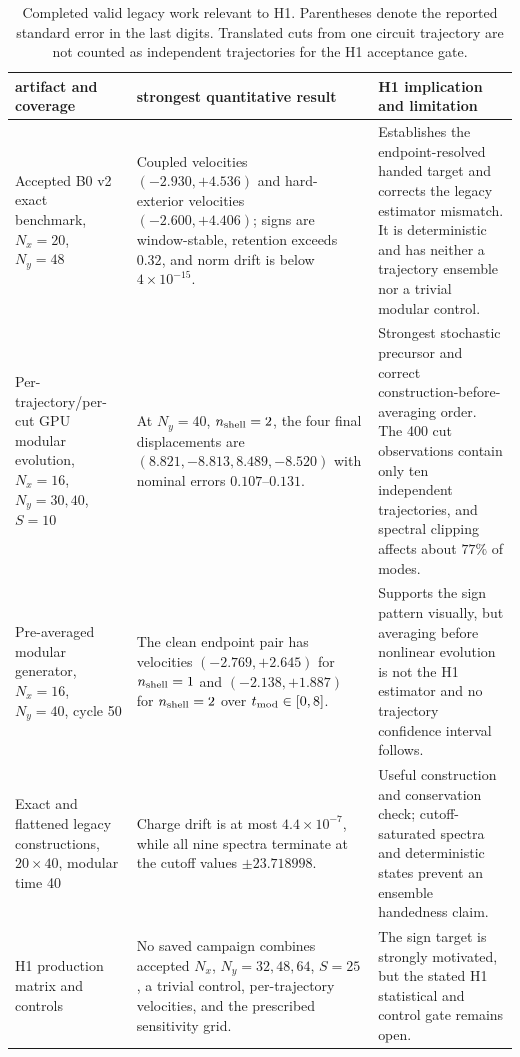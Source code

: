\documentclass[aps,prx,twocolumn,floatfix,nofootinbib,superscriptaddress,longbibliography]{revtex4-2}
\newcommand{\campaignTableSetup}{%
  \footnotesize
  \setlength{\tabcolsep}{4pt}%
  \renewcommand{\arraystretch}{1.12}%
}
\begin{document}
\begin{table}[t]
\campaignTableSetup
\caption{Completed valid legacy work relevant to H1.  Parentheses denote the reported
standard error in the last digits.  Translated cuts from one circuit trajectory are not
counted as independent trajectories for the H1 acceptance gate.}
\label{tab:H1-legacy}
\begin{tabularx}{\textwidth}{@{}L{0.75}L{1.10}L{1.15}@{}}
\toprule
artifact and coverage & strongest quantitative result & H1 implication and limitation \\
\midrule
Accepted B0 v2 exact benchmark, $N_x=20$, $N_y=48$
& Coupled velocities $(-2.930,+4.536)$ and hard-exterior velocities
$(-2.600,+4.406)$; signs are window-stable, retention exceeds $0.32$, and norm drift is
below $4\times10^{-15}$.
& Establishes the endpoint-resolved handed target and corrects the legacy estimator
mismatch.  It is deterministic and has neither a trajectory ensemble nor a trivial
modular control. \\
Per-trajectory/per-cut GPU modular evolution, $N_x=16$, $N_y=30,40$, $S=10$
& At $N_y=40$, $n_{\rm shell}=2$, the four final displacements are
$(8.821,-8.813,8.489,-8.520)$ with nominal errors $0.107$--$0.131$.
& Strongest stochastic precursor and correct construction-before-averaging order.
The 400 cut observations contain only ten independent trajectories, and spectral clipping
affects about $77\%$ of modes. \\
Pre-averaged modular generator, $N_x=16$, $N_y=40$, cycle 50
& The clean endpoint pair has velocities $(-2.769,+2.645)$ for $n_{\rm shell}=1$ and
$(-2.138,+1.887)$ for $n_{\rm shell}=2$ over $t_{\rm mod}\in[0,8]$.
& Supports the sign pattern visually, but averaging before nonlinear evolution is not the
H1 estimator and no trajectory confidence interval follows. \\
Exact and flattened legacy constructions, $20\times40$, modular time 40
& Charge drift is at most $4.4\times10^{-7}$, while all nine spectra terminate at the
cutoff values $\pm23.718998$.
& Useful construction and conservation check; cutoff-saturated spectra and deterministic
states prevent an ensemble handedness claim. \\
H1 production matrix and controls
& No saved campaign combines accepted $N_x$, $N_y=32,48,64$, $S=25$, a trivial control,
per-trajectory velocities, and the prescribed sensitivity grid.
& The sign target is strongly motivated, but the stated H1 statistical and control gate
remains open. \\
\bottomrule
\end{tabularx}
\end{table}
\end{document}
